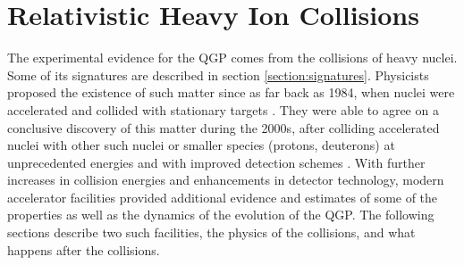 \chapter{Relativistic Heavy Ion Collisions}\label{ch:RHI-collisions}
The experimental evidence for the QGP comes from the collisions of heavy nuclei. Some of its signatures are described in section \ref{section:signatures}. Physicists proposed the existence of such matter since as far back as 1984, when nuclei were accelerated and collided with stationary targets \cite{Gyulassy:2004vg}. They were able to agree on a conclusive discovery of this matter during the 2000s, after colliding accelerated nuclei with other such nuclei or smaller species (protons, deuterons) at unprecedented energies and with improved detection schemes \cite{Ritter:2004xj}. With further increases in collision energies and enhancements in detector technology, modern accelerator facilities provided additional evidence and estimates of some of the properties as well as the dynamics of the evolution of the QGP. The following sections describe two such facilities, the physics of the collisions, and what happens after the collisions.


